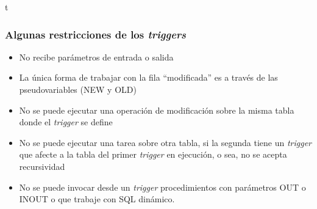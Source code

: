 
\begin{frame}{t}
	
	\frametitle{Algunas restricciones de los \emph{triggers}}
	
	\begin{itemize}
		
		\item No recibe parámetros de entrada o salida
		
		\pause
		
		\item La única forma de trabajar con la fila ``modificada'' es a través de las pseudovariables (\textcolor{codepurple}{NEW} y \textcolor{codepurple}{OLD})
		
		\pause
		
		\item No se puede ejecutar una operación de modificación sobre la misma tabla donde el \emph{trigger} se define
		
		\pause
		
		\item No se puede ejecutar una tarea sobre otra tabla, si la segunda tiene un \emph{trigger} que afecte a la tabla del primer \emph{trigger} en ejecución, o sea, no se acepta recursividad
		
		\pause
		
		\item No se puede invocar desde un \emph{trigger} procedimientos con parámetros \textcolor{codepurple}{OUT} o \textcolor{codepurple}{INOUT} o que trabaje con SQL dinámico.
		
	\end{itemize}
	
\end{frame}
